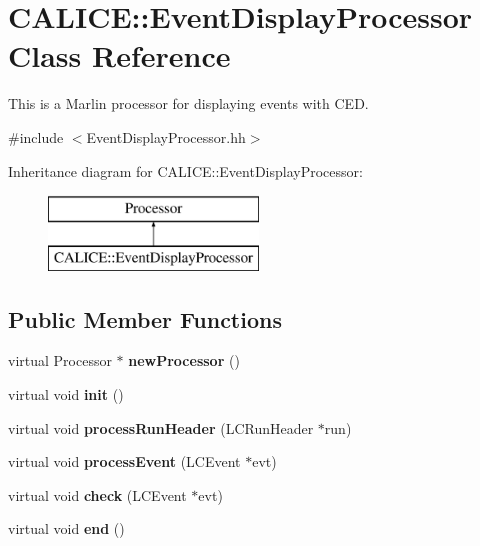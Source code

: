 \section{C\-A\-L\-I\-C\-E\-:\-:Event\-Display\-Processor Class Reference}
\label{classCALICE_1_1EventDisplayProcessor}


This is a Marlin processor for displaying events with C\-E\-D.  




{\ttfamily \#include $<$Event\-Display\-Processor.\-hh$>$}

Inheritance diagram for C\-A\-L\-I\-C\-E\-:\-:Event\-Display\-Processor\-:\begin{figure}[H]
\begin{center}
\leavevmode
\includegraphics[height=2.000000cm]{classCALICE_1_1EventDisplayProcessor}
\end{center}
\end{figure}
\subsection*{Public Member Functions}
\begin{DoxyCompactItemize}
\item 
virtual Processor $\ast$ {\bfseries new\-Processor} ()\label{classCALICE_1_1EventDisplayProcessor_a34077bee4a0c9c8872846638252f9bac}

\item 
virtual void {\bf init} ()
\item 
virtual void {\bf process\-Run\-Header} (L\-C\-Run\-Header $\ast$run)
\item 
virtual void {\bf process\-Event} (L\-C\-Event $\ast$evt)
\item 
virtual void {\bfseries check} (L\-C\-Event $\ast$evt)\label{classCALICE_1_1EventDisplayProcessor_a60086f666abafbabb0b348a46da34df6}

\item 
virtual void {\bf end} ()
\end{DoxyCompactItemize}
